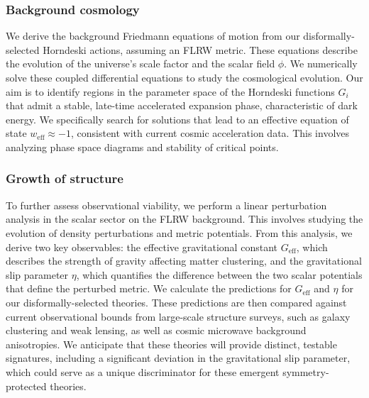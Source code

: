 \documentclass[twocolumn]{aastex631}
\begin{document}
\subsubsection{Background cosmology}
We derive the background Friedmann equations of motion from our disformally-selected Horndeski actions, assuming an FLRW metric. These equations describe the evolution of the universe's scale factor and the scalar field $\phi$. We numerically solve these coupled differential equations to study the cosmological evolution. Our aim is to identify regions in the parameter space of the Horndeski functions $G_i$ that admit a stable, late-time accelerated expansion phase, characteristic of dark energy. We specifically search for solutions that lead to an effective equation of state $w_{\text{eff}} \approx -1$, consistent with current cosmic acceleration data. This involves analyzing phase space diagrams and stability of critical points.

\subsubsection{Growth of structure}
To further assess observational viability, we perform a linear perturbation analysis in the scalar sector on the FLRW background. This involves studying the evolution of density perturbations and metric potentials. From this analysis, we derive two key observables: the effective gravitational constant $G_{\text{eff}}$, which describes the strength of gravity affecting matter clustering, and the gravitational slip parameter $\eta$, which quantifies the difference between the two scalar potentials that define the perturbed metric. We calculate the predictions for $G_{\text{eff}}$ and $\eta$ for our disformally-selected theories. These predictions are then compared against current observational bounds from large-scale structure surveys, such as galaxy clustering and weak lensing, as well as cosmic microwave background anisotropies. We anticipate that these theories will provide distinct, testable signatures, including a significant deviation in the gravitational slip parameter, which could serve as a unique discriminator for these emergent symmetry-protected theories.
\end{document}
